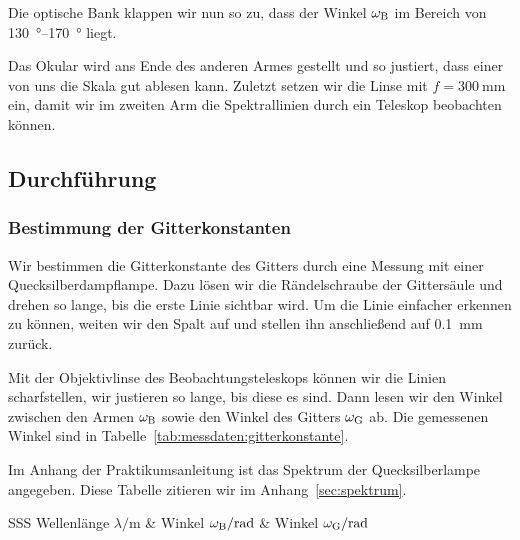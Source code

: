 Die optische Bank klappen wir nun so zu, dass der Winkel $\omega_\text B$ im
Bereich von \SIrange{130}{170}{\degree} liegt.

Das Okular wird ans Ende des anderen Armes gestellt und so justiert, dass einer
von uns die Skala gut ablesen kann. Zuletzt setzen wir die Linse mit $f =
\SI{300}{\milli\meter}$ ein, damit wir im zweiten Arm die Spektrallinien durch
ein Teleskop beobachten können.

\FloatBarrier
\subsection{Durchführung}

\FloatBarrier
\subsubsection{Bestimmung der Gitterkonstanten}
\label{sec:gitterkonstante/durchführung}

Wir bestimmen die Gitterkonstante des Gitters durch eine Messung mit einer
Quecksilberdampflampe. Dazu lösen wir die Rändelschraube der Gittersäule und
drehen so lange, bis die erste Linie sichtbar wird. Um die Linie einfacher
erkennen zu können, weiten wir den Spalt auf und stellen ihn anschließend auf
\SI{0.1}{\milli\meter} zurück.

Mit der Objektivlinse des Beobachtungsteleskops können wir die Linien
scharfstellen, wir justieren so lange, bis diese es sind. Dann lesen wir den
Winkel zwischen den Armen $\omega_\text B$ sowie den Winkel des Gitters
$\omega_\text G$ ab. Die gemessenen Winkel sind in
Tabelle~\ref{tab:messdaten:gitterkonstante}.

Im Anhang der Praktikumsanleitung ist das Spektrum der Quecksilberlampe
angegeben. Diese Tabelle zitieren wir im Anhang~\ref{sec:spektrum}.

\begin{table}[htbp]
    \centering
    \begin{tabular}{SSS}
        {Wellenlänge $\lambda / \si\meter$} & {Winkel $\omega_\text B /
    \si\radian$}  & {Winkel $\omega_\text G / \si\radian$} \\
        \hline
    \end{tabular}
    \caption{%
        Messdaten für die Bestimmung der Gitterkonstanten mit der
        Quecksilberlampe.
    }
    \label{tab:messdaten:gitterkonstante}
\end{table}

